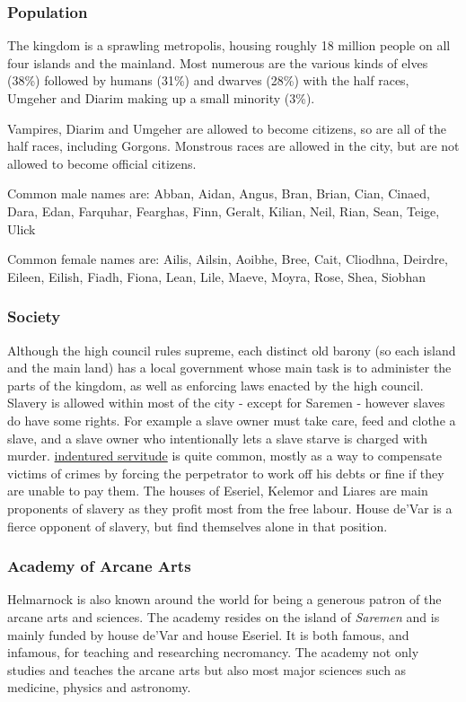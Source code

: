 \subsubsection{Population}

The kingdom is a sprawling metropolis, housing roughly 18 million people on
all four islands and the mainland. Most numerous are the various kinds of
elves (38\%) followed by humans (31\%) and dwarves (28\%) with the half
races, Umgeher and Diarim making up a small minority (3\%).

Vampires, Diarim and Umgeher are allowed to become citizens, so are all of the
half races, including Gorgons. Monstrous races are allowed in the city, but
are not allowed to become official citizens.

Common male names are: Abban, Aidan, Angus, Bran, Brian, Cian, Cinaed, Dara,
Edan, Farquhar, Fearghas, Finn, Geralt, Kilian, Neil, Rian, Sean, Teige, Ulick

Common female names are: Ailis, Ailsin, Aoibhe, Bree, Cait, Cliodhna, Deirdre,
Eileen, Eilish, Fiadh, Fiona, Lean, Lile, Maeve, Moyra, Rose, Shea, Siobhan

\subsubsection{Society}

Although the high council rules supreme, each distinct old barony (so each
island and the main land) has a local government whose main task is to
administer the parts of the kingdom, as well as enforcing laws enacted by the
high council. Slavery is allowed within most of the city - except for Saremen
- however slaves do have some rights. For example a slave owner must take
care, feed and clothe a slave, and a slave owner who intentionally lets a
slave starve is charged with murder. \hyperref[sec:Indentured
  Servitude]{indentured servitude} is quite common, mostly as a way to
compensate victims of crimes by forcing the perpetrator to work off his debts
or fine if they are unable to pay them. The houses of Eseriel, Kelemor and
Liares are main proponents of slavery as they profit most from the free
labour. House de'Var is a fierce opponent of slavery, but find themselves
alone in that position.

\subsubsection{Academy of Arcane Arts}

Helmarnock is also known around the world for being a generous patron of the
arcane arts and sciences. The academy resides on the island of \emph{Saremen}
and is mainly funded by house de'Var and house Eseriel. It is both famous,
and infamous, for teaching and researching necromancy. The academy not only
studies and teaches the arcane arts but also most major sciences such as
medicine, physics and astronomy.

